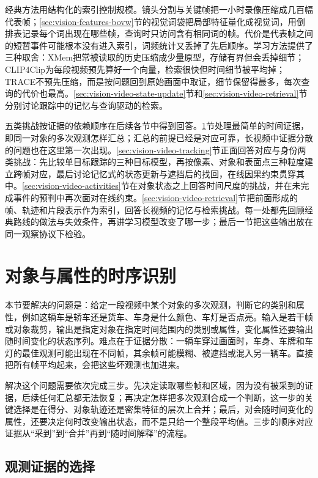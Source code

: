 经典方法用结构化的索引控制规模。镜头分割与关键帧把一小时录像压缩成几百幅代表帧；\ref{sec:vision-features-bovw}节的视觉词袋把局部特征量化成视觉词，用倒排表记录每个词出现在哪些帧，查询时只访问含有相同词的帧。代价是代表帧之间的短暂事件可能根本没有进入索引，词频统计又丢掉了先后顺序。学习方法提供了三种取舍：XMem把常被读取的历史压缩成少量原型，存储有界但会丢掉细节；CLIP4Clip为每段视频预先算好一个向量，检索很快但时间细节被平均掉；TRACE不预先压缩，而是按问题回到原始画面中取证，细节保留得最多，每次查询的代价也最高。\ref{sec:vision-video-state-update}节和\ref{sec:vision-video-retrieval}节分别讨论跟踪中的记忆与查询驱动的检索。

五类挑战按证据的依赖顺序在后续各节中得到回答。\ref{sec:vision-video-object-recognition}节处理最简单的时间证据，即同一对象的多次观测怎样汇总；汇总的前提已经是对应可靠，长视频中证据分散的问题也在这里第一次出现。\ref{sec:vision-video-tracking}节正面回答对应与身份两类挑战：先比较单目标跟踪的三种目标模型，再按像素、对象和表面点三种粒度建立跨帧对应，最后讨论记忆式的状态更新与遮挡后的找回，在线因果约束贯穿其中。\ref{sec:vision-video-activities}节在对象状态之上回答时间尺度的挑战，并在未完成事件的预判中再次面对在线约束。\ref{sec:vision-video-retrieval}节把前面形成的帧、轨迹和片段表示作为索引，回答长视频的记忆与检索挑战。每一处都先回顾经典路线的做法与失效条件，再讲学习模型改变了哪一步；最后一节把这些输出放在同一观察协议下检验。

\section{对象与属性的时序识别}
\label{sec:vision-video-object-recognition}

本节要解决的问题是：给定一段视频中某个对象的多次观测，判断它的类别和属性，例如这辆车是轿车还是货车、车身是什么颜色、车灯是否点亮。输入是若干帧或对象裁剪，输出是指定对象在指定时间范围内的类别或属性，变化属性还要输出随时间变化的状态序列。难点在于证据分散：一辆车穿过画面时，车身、车牌和车灯的最佳观测可能出现在不同帧，其余帧可能模糊、被遮挡或混入另一辆车。直接把所有帧平均起来，会把这些坏观测也加进来。

解决这个问题需要依次完成三步。先决定读取哪些帧和区域，因为没有被采到的证据，后续任何汇总都无法恢复；再决定怎样把多次观测合成一个判断，这一步的关键选择是在得分、对象轨迹还是密集特征的层次上合并；最后，对会随时间变化的属性，还要决定何时改变输出状态，而不是只给一个整段平均值。三步的顺序对应证据从“采到”到“合并”再到“随时间解释”的流程。

\subsection{观测证据的选择}
\label{sec:vision-video-evidence-selection}

